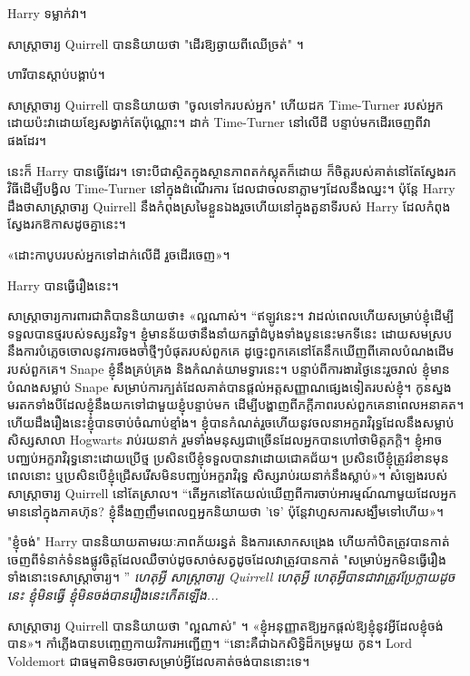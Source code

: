 Harry ទម្លាក់វា។

សាស្រ្តាចារ្យ Quirrell បាននិយាយថា "ដើរឱ្យឆ្ងាយពីឈើច្រត់" ។

ហារីបានស្តាប់បង្គាប់។

សាស្ត្រាចារ្យ Quirrell បាននិយាយថា "ចូលទៅករបស់អ្នក" ហើយដក Time-Turner របស់អ្នក ដោយប៉ះវាដោយខ្សែសង្វាក់តែប៉ុណ្ណោះ។ ដាក់ ​​Time-Turner នៅលើដី បន្ទាប់មកដើរចេញពីវាផងដែរ។

នេះក៏ Harry បានធ្វើដែរ។ ទោះបីជាស្ថិតក្នុងស្ថានភាពតក់ស្លុតក៏ដោយ ក៏ចិត្តរបស់គាត់នៅតែស្វែងរកវិធីដើម្បីបង្វិល Time-Turner នៅក្នុងដំណើរការ ដែលជាចលនាភ្លាមៗដែលនឹងឈ្នះ។ ប៉ុន្តែ Harry ដឹងថាសាស្រ្តាចារ្យ Quirrell នឹងកំពុងស្រមៃខ្លួនឯងរួចហើយនៅក្នុងតួនាទីរបស់ Harry ដែលកំពុងស្វែងរកឱកាសដូចគ្នានេះ។

«ដោះ​កាបូប​របស់​អ្នក​ទៅ​ដាក់​លើ​ដី រួច​ដើរ​ចេញ»។

Harry បានធ្វើរឿងនេះ។

សាស្ត្រាចារ្យ​ការពារ​ជាតិ​បាន​និយាយ​ថា​៖ «​ល្អ​ណាស់​។ “ឥឡូវនេះ។ វាដល់ពេលហើយសម្រាប់ខ្ញុំដើម្បីទទួលបានថ្មរបស់ទស្សនវិទូ។ ខ្ញុំ​មាន​ន័យ​ថា​នឹង​នាំ​យក​ឆ្នាំ​ដំបូង​ទាំង​បួន​នេះ​មក​ទី​នេះ ដោយ​សម​ស្រប​នឹង​ការ​បំភ្លេច​ចោល​នូវ​ការ​ចង​ចាំ​ថ្មីៗ​បំផុត​របស់​ពួក​គេ ដូច្នេះ​ពួក​គេ​នៅ​តែ​នឹក​ឃើញ​ពី​គោល​បំណង​ដើម​របស់​ពួក​គេ។ Snape ខ្ញុំនឹងគ្រប់គ្រង និងកំណត់យាមទ្វារនេះ។ បន្ទាប់ពីការងារថ្ងៃនេះរួចរាល់ ខ្ញុំមានបំណងសម្លាប់ Snape សម្រាប់ការក្បត់ដែលគាត់បានផ្តល់អត្តសញ្ញាណផ្សេងទៀតរបស់ខ្ញុំ។ កូន​ស្នង​មរតក​ទាំង​បី​ដែល​ខ្ញុំ​នឹង​យក​ទៅ​ជា​មួយ​ខ្ញុំ​បន្ទាប់​មក ដើម្បី​បង្ហាញ​ពី​ភក្ដីភាព​របស់​ពួក​គេ​នា​ពេល​អនាគត។ ហើយដឹងរឿងនេះខ្ញុំបានចាប់ចំណាប់ខ្មាំង។ ខ្ញុំបានកំណត់រួចហើយនូវចលនាអក្ខរាវិរុទ្ធដែលនឹងសម្លាប់សិស្សសាលា Hogwarts រាប់រយនាក់ រួមទាំងមនុស្សជាច្រើនដែលអ្នកបានហៅថាមិត្តភក្តិ។ ខ្ញុំអាចបញ្ឈប់អក្ខរាវិរុទ្ធនោះដោយប្រើថ្ម ប្រសិនបើខ្ញុំទទួលបានវាដោយជោគជ័យ។ ប្រសិនបើ​ខ្ញុំ​ត្រូវ​រំខាន​មុន​ពេល​នោះ ឬ​ប្រសិនបើ​ខ្ញុំ​ជ្រើសរើស​មិន​បញ្ឈប់​អក្ខរាវិរុទ្ធ សិស្ស​រាប់រយ​នាក់​នឹង​ស្លាប់​»​។ សំឡេងរបស់សាស្រ្តាចារ្យ Quirrell នៅតែស្រាល។ “តើ​អ្នក​នៅ​តែ​យល់​ឃើញ​ពី​ការ​ចាប់​អារម្មណ៍​ណា​មួយ​ដែល​អ្នក​មាន​នៅ​ក្នុង​ភាគហ៊ុន? ខ្ញុំ​នឹង​ញញឹម​ពេល​ឮ​អ្នក​និយាយ​ថា 'ទេ' ប៉ុន្តែ​វា​ហួស​ការ​សង្ឃឹម​ទៅ​ហើយ»។

"ខ្ញុំចង់" Harry បាននិយាយតាមរយៈភាពភ័យរន្ធត់ និងការសោកសង្រេង ហើយកាំបិតត្រូវបានកាត់ចេញពីទំនាក់ទំនងផ្លូវចិត្តដែលឈឺចាប់ដូចសាច់សត្វដូចដែលវាត្រូវបានកាត់ "សម្រាប់អ្នកមិនធ្វើរឿងទាំងនោះទេសាស្រ្តាចារ្យ។ ” \emph{ហេតុអ្វី សាស្រ្តាចារ្យ Quirrell ហេតុអ្វី ហេតុអ្វីបានជាវាត្រូវប្រែក្លាយដូចនេះ ខ្ញុំមិនធ្វើ ខ្ញុំមិនចង់បានរឿងនេះកើតឡើង...}

សាស្រ្តាចារ្យ Quirrell បាននិយាយថា "ល្អណាស់" ។ «ខ្ញុំ​អនុញ្ញាត​ឱ្យ​អ្នក​ផ្ដល់​ឱ្យ​ខ្ញុំ​នូវ​អ្វី​ដែល​ខ្ញុំ​ចង់​បាន»។ កាំភ្លើងបានបញ្ចេញកាយវិការអញ្ជើញ។ “នោះគឺជាឯកសិទ្ធិដ៏កម្រមួយ កូន។ Lord Voldemort ជាធម្មតាមិនចរចាសម្រាប់អ្វីដែលគាត់ចង់បាននោះទេ។

